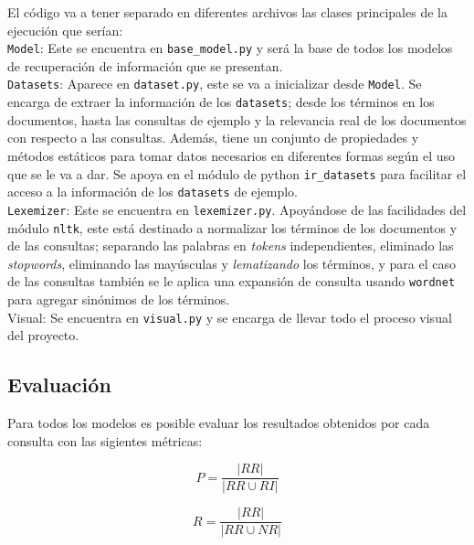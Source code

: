 \documentclass[spanish]{article}
\begin{document}
		
		El código va a tener separado en diferentes archivos las clases principales de la ejecución que serían:\\

		\texttt{Model}: Este se encuentra en \texttt{base\_model.py} y será la base de todos los modelos de recuperación de información que se presentan.\\

		\texttt{Datasets}: Aparece en \texttt{dataset.py}, este se va a inicializar desde \texttt{Model}. Se encarga de extraer la información de los \texttt{datasets}; desde los términos en los documentos, hasta las consultas de ejemplo y la relevancia real de los documentos con respecto a las consultas. Además, tiene un conjunto de propiedades y métodos estáticos para tomar datos necesarios en diferentes formas según el uso que se le va a dar. Se apoya en el módulo de python \texttt{ir\_datasets} para facilitar el acceso a la información de los \texttt{datasets} de ejemplo.\\

		\texttt{Lexemizer}: Este se encuentra en \texttt{lexemizer.py}. Apoyándose de las facilidades del módulo \texttt{nltk}, este está destinado a normalizar los términos de los documentos y de las consultas; separando las palabras en \emph{tokens} independientes, eliminado las \emph{stopwords}, eliminando las mayúsculas y \emph{lematizando} los términos, y para el caso de las consultas también se le aplica una expansión de consulta usando \texttt{wordnet} para agregar sinónimos de los términos.\\

		Visual: Se encuentra en \texttt{visual.py} y se encarga de llevar todo el proceso visual del proyecto.

		\subsection*{Evaluación}

			Para todos los modelos es posible evaluar los resultados obtenidos por cada consulta con las sigientes métricas:
		
		\begin{equation}
			\displaystyle P = \frac{|RR| }{| RR \cup  RI |}
		\end{equation}

		\begin{equation}
			\displaystyle R = \frac{|RR| }{| RR \cup  NR |}
		\end{equation}
\end{document}
